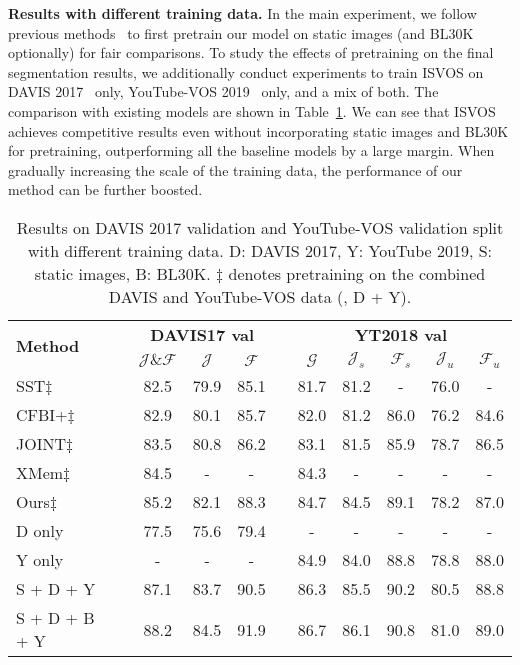 \documentclass[10pt,twocolumn,letterpaper]{article}
\newcommand{\system}{ISVOS\xspace}
\begin{document}
\vspace{0.05in}
\noindent \textbf{Results with different training data.} In the main experiment, we follow previous methods~\cite{oh2019video,cheng2021mivos,cheng2021stcn,cheng2022xmem} to first pretrain our model on static images (and BL30K optionally) for fair comparisons. To study the effects of pretraining on the final segmentation results, we additionally conduct experiments to train \system on DAVIS 2017~\cite{pont20172017} only, YouTube-VOS 2019~\cite{xu2018YouTube} only, and a mix of both. The comparison with existing models are shown in Table~\ref{tab:data}. We can see that \system achieves competitive results even without incorporating static images and BL30K for pretraining, outperforming all the baseline models by a large margin. When gradually increasing the scale of the training data, the performance of our method can be further boosted.

\begin{table}[!ht]
\centering
  \renewcommand\arraystretch{1.1}
  \setlength{\tabcolsep}{0pt}
  \begin{tabular*}{\linewidth}{@{\extracolsep{\fill}}lc | cccc | ccccc @{}}
    \toprule
    \multirow{2}{0.7in}{\textbf{Method}} && \multicolumn{3}{c}{\textbf{DAVIS17 val}} && \multicolumn{5}{c}{\textbf{YT2018 val}}  \\
    ~ && $\mathcal{J\&F}$ & $\mathcal{J}$ & $\mathcal{F}$ &&  $\mathcal{G}$ & $\mathcal{J}_{s}$ & $\mathcal{F}_{s}$ & $\mathcal{J}_{u}$ & $\mathcal{F}_{u}$ \\
    \midrule
    SST$\ddagger$~\cite{duke2021sstvos} && 82.5 & 79.9 & 85.1 && 81.7 & 81.2 & - & 76.0 & - \\
    CFBI+$\ddagger$~\cite{yang2021collaborative} && 82.9 & 80.1 & 85.7 && 82.0 & 81.2 & 86.0 & 76.2 & 84.6 \\
    JOINT$\ddagger$~\cite{mao2021joint} && 83.5 & 80.8 & 86.2 && 83.1 & 81.5 & 85.9 & 78.7 & 86.5 \\
    XMem$\ddagger$ && 84.5 & - & - && 84.3 & - & - & - & -\\
    Ours$\ddagger$ && 85.2 & 82.1 & 88.3 && 84.7 & 84.5 & 89.1 & 78.2 & 87.0 \\
    \cmidrule{1-1} \cmidrule{3-11}
    D only && 77.5 & 75.6 & 79.4 && - & - & - & - & - \\
    Y only && - & - & - && 84.9 & 84.0 & 88.8 & 78.8 &  88.0 \\
    S + D + Y && 87.1 & 83.7 & 90.5 && 86.3 & 85.5 & 90.2 & 80.5 & 88.8 \\
    S + D + B + Y && 88.2 & 84.5 & 91.9 && 86.7 & 86.1 & 90.8 & 81.0 & 89.0 \\
    \bottomrule
  \end{tabular*}
  \vspace{-0.1in}
 \caption{Results on DAVIS 2017 validation and YouTube-VOS validation split with different training data. D: DAVIS 2017, Y: YouTube 2019, S: static images, B: BL30K.  $\ddagger$ denotes pretraining on the combined DAVIS and YouTube-VOS data (\ie, D + Y). }
\label{tab:data}
\vspace{0.1in}
\end{table}
\end{document}

